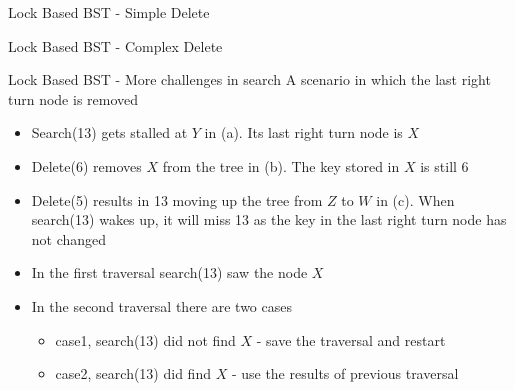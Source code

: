 \begin{frame}[c]{Lock Based BST - Simple Delete}

\end{frame}

\begin{frame}[c]{Lock Based BST - Complex Delete}

\end{frame}

\begin{frame}{Lock Based BST - More challenges in search}
A scenario in which the last right turn node is removed

\begin{itemize}
\item<1> \footnotesize Search(13) gets stalled at $Y$ in (a). Its last right turn node is $X$
\item<2> \footnotesize Delete(6) removes $X$ from the tree in (b). The key stored in $X$ is still 6
\item<3> \footnotesize Delete(5) results in 13 moving up the tree from $Z$ to $W$ in (c). When search(13) wakes up, it will miss 13 as the key in the last right turn node has not changed
\end{itemize}


\begin{itemize}
\item<4> \footnotesize In the first traversal search(13) saw the node $X$
\item<4> \footnotesize In the second traversal there are two cases
\begin{itemize}
\item<4> \tiny case1, search(13) did not find $X$ - save the traversal and restart
\item<4> \tiny case2, search(13) did find $X$ - use the results of previous traversal
\end{itemize}
\end{itemize}

\end{frame}